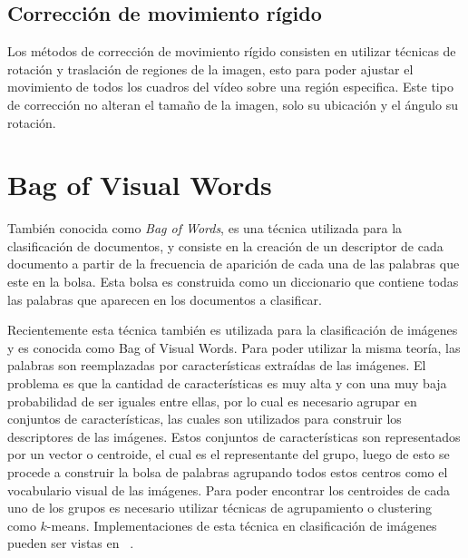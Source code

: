 	\subsection{Corrección de movimiento rígido}
	\label{sec:rigid}
	Los métodos de corrección de movimiento rígido consisten en utilizar técnicas de rotación y traslación de regiones de la imagen, esto para poder ajustar el movimiento de todos los cuadros del vídeo sobre una región especifica. Este tipo de corrección no alteran el tamaño de la imagen, solo su ubicación y el ángulo su rotación.


\section{Bag of Visual Words}
\label{sec:bag_of_words}
También conocida como \textit{Bag of Words}, es una técnica utilizada para la clasificación de documentos, y consiste en la creación de un descriptor de cada documento a partir de la frecuencia de aparición de cada una de las palabras que este en la bolsa. Esta bolsa es construida como un diccionario que contiene todas las palabras que aparecen en los documentos a clasificar.

Recientemente esta técnica también es utilizada para la clasificación de imágenes y es conocida como Bag of Visual Words. Para poder utilizar la misma teoría, las palabras son reemplazadas por características extraídas de las imágenes. El problema es que la cantidad de características es muy alta y con una muy baja probabilidad de ser iguales entre ellas, por lo cual es necesario agrupar en conjuntos de características, las cuales son utilizados para construir los descriptores de las imágenes. Estos conjuntos de características son representados por un vector o centroide, el cual es el representante del grupo, luego de esto se procede a construir la bolsa de palabras agrupando todos estos centros como el vocabulario visual de las imágenes. Para poder encontrar los centroides de cada uno de los grupos es necesario utilizar técnicas de agrupamiento o clustering como $k$-means. Implementaciones de esta técnica en clasificación de imágenes pueden ser vistas en ~\cite{Csurka2004,Dollar2005,Sivic2009}.

